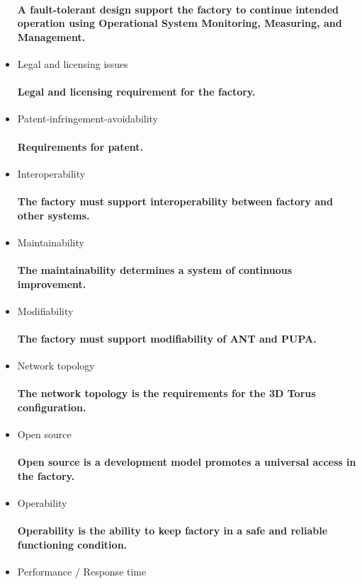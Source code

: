 \documentclass{acm_proc_article-sp}
\begin{document}
\begin{itemize}
\paragraph{A fault-tolerant design support the factory to continue intended operation using Operational System Monitoring, Measuring, and Management.}
\item Legal and licensing issues
\paragraph{Legal and licensing requirement for the factory.}
\item Patent-infringement-avoidability
\paragraph{Requirements for patent.}
\item Interoperability
\paragraph{The factory must support interoperability between factory and other systems.}
\item Maintainability
\paragraph{The maintainability determines a system of continuous improvement.}
\item Modifiability
\paragraph{The factory must support modifiability of ANT and PUPA.}
\item Network topology
\paragraph{The network topology is the requirements for the 3D Torus configuration.}
\item Open source
\paragraph{Open source is a development model promotes a universal access in the factory.}
\item Operability
\paragraph{Operability is the ability to keep factory in a safe and reliable functioning condition.}
\item Performance / Response time

\end{itemize}
\end{document}
